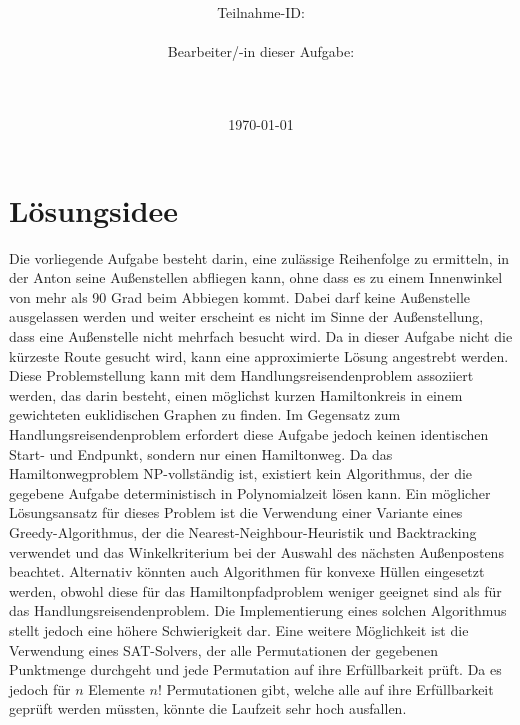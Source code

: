 \documentclass[a4paper,10pt,ngerman]{scrartcl}
\title{\textbf{\Huge\Aufgabe}}
\author{\LARGE Teilnahme-ID: \LARGE \TeilnahmeId \\\\
\LARGE Bearbeiter/-in dieser Aufgabe: \\
\LARGE \Name\\\\}
\date{\LARGE\today}
\begin{document}
    \maketitle
    \tableofcontents
    \vspace{0.5cm}
    \newpage


    \section{Lösungsidee}\label{sec:losungsidee}

    Die vorliegende Aufgabe besteht darin, eine zulässige Reihenfolge zu ermitteln,
    in der Anton seine Außenstellen abfliegen kann,
    ohne dass es zu einem Innenwinkel von mehr als 90 Grad beim Abbiegen kommt.
    Dabei darf keine Außenstelle ausgelassen werden und weiter erscheint es nicht im Sinne der Außenstellung,
    dass eine Außenstelle nicht mehrfach besucht wird.
    Da in dieser Aufgabe nicht die kürzeste Route gesucht wird, kann eine approximierte Lösung angestrebt werden.
    \newline\newline
    Diese Problemstellung kann mit dem Handlungsreisendenproblem assoziiert werden,
    das darin besteht, einen möglichst kurzen Hamiltonkreis in einem gewichteten euklidischen Graphen zu finden.
    Im Gegensatz zum Handlungsreisendenproblem erfordert diese Aufgabe jedoch keinen identischen Start- und Endpunkt,
    sondern nur einen Hamiltonweg.
    Da das Hamiltonwegproblem NP-vollständig ist,
    existiert kein Algorithmus, der die gegebene Aufgabe deterministisch in Polynomialzeit lösen kann.
    \newline\newline
    Ein möglicher Lösungsansatz für dieses Problem ist die Verwendung einer Variante eines Greedy-Algorithmus,
    der die Nearest-Neighbour-Heuristik und Backtracking verwendet
    und das Winkelkriterium bei der Auswahl des nächsten Außenpostens beachtet.
    Alternativ könnten auch Algorithmen für konvexe Hüllen eingesetzt werden,
    obwohl diese für das Hamiltonpfadproblem weniger geeignet sind als für das Handlungsreisendenproblem.
    Die Implementierung eines solchen Algorithmus stellt jedoch eine höhere Schwierigkeit dar.
    Eine weitere Möglichkeit ist die Verwendung eines SAT-Solvers, der alle Permutationen der gegebenen Punktmenge durchgeht und
    jede Permutation auf ihre Erfüllbarkeit prüft.
    Da es jedoch für $n$ Elemente $n!$ Permutationen gibt, welche alle auf ihre Erfüllbarkeit geprüft werden müssten,
    könnte die Laufzeit sehr hoch ausfallen.
\end{document}
